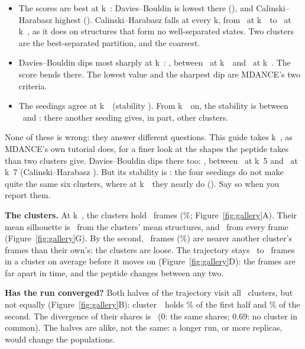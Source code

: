 \documentclass[11pt,letterpaper]{article}
\begin{document}
\begin{itemize}
  \item The scores are best at k~\qsDbLowest: Davies--Bouldin is lowest there
    (\qsDbLowestValue), and Calinski--Harabasz highest (\qsChHighestValue).
    Calinski--Harabasz falls at every k, from \qsChFirst\ at k~\qsKFirst\ to
    \qsChLast\ at k~\qsKLast, as it does on structures that form no
    well-separated states. Two clusters are the best-separated partition, and
    the coarsest.
  \item Davies--Bouldin dips most sharply at k~\qsDbDip: \qsDbDipValue, between
    \qsDbDipBefore\ at k~\qsDbDipBeforeK\ and \qsDbDipAfter\ at
    k~\qsDbDipAfterK. The score bends there. The lowest value and the sharpest
    dip are MDANCE's two criteria.
  \item The seedings agree at k~\qsStable\ (stability \qsStableValues).
    From k~\qsAboveFrom\ on, the stability is between \qsAboveMin\ and
    \qsAboveMax: there another seeding gives, in part, other clusters.
\end{itemize}

None of these is wrong: they answer different questions. This guide takes
k~\qsK, as MDANCE's own tutorial does, for a finer look at the shapes the
peptide takes than two clusters give. Davies--Bouldin dips there too:
\qsKDb, between \qsKDbBefore\ at k~5 and \qsKDbAfter\ at k~7
(Calinski--Harabasz \qsKCh). But its stability is
\qsKStability: the four seedings do not make quite the same six clusters,
where at k~\qsStableLast\ they nearly do (\qsStableLastValue). Say so when
you report them.

\textbf{The clusters.} At k~\qsK, the clusters hold \qsSizes\ frames
(\qsPcts\%; Figure~\ref{fig:gallery}A). Their mean silhouette is
\qsSilCentroid\ from the clusters' mean structures, and \qsSilPairs\ from
every frame (Figure~\ref{fig:gallery}G). By the second, \qsSilNegative\
frames (\qsSilNegativePct\%) are nearer another cluster's frames than their
own's: the clusters are loose. The trajectory stays \qsStayMin\ to
\qsStayMax\ frames in a cluster on average before it moves on
(Figure~\ref{fig:gallery}D): the frames are far apart in time, and the
peptide changes between any two.

\textbf{Has the run converged?} Both halves of the trajectory visit all
\qsK\ clusters, but not equally (Figure~\ref{fig:gallery}B):
cluster~\qsDiffCluster\ holds \qsDiffFirstPct\% of the first half and
\qsDiffSecondPct\% of the second. The divergence of their shares is
\qsDivergence\ (0: the same shares; 0.69: no cluster in common). The halves
are alike, not the same: a longer run, or more replicas, would change the
populations.
\end{document}
